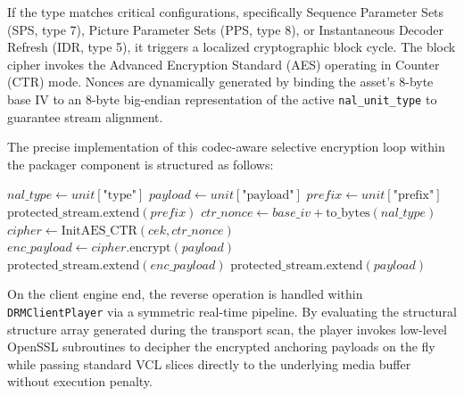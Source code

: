 If the type matches critical configurations, specifically Sequence Parameter Sets (SPS, type 7), Picture Parameter Sets (PPS, type 8), or Instantaneous Decoder Refresh (IDR, type 5), it triggers a localized cryptographic block cycle. The block cipher invokes the Advanced Encryption Standard (AES) operating in Counter (CTR) mode. Nonces are dynamically generated by binding the asset's 8-byte base IV to an 8-byte big-endian representation of the active \texttt{nal\_unit\_type} to guarantee stream alignment. 

The precise implementation of this codec-aware selective encryption loop within the packager component is structured as follows:

\begin{algorithm}[H]
\caption{Codec-Aware Selective Stream Encryption Loop}\label{alg:selective_loop}
\begin{algorithmic}[1]
    \State $nal\_type \leftarrow unit[\text{"type"}]$
    \State $payload \leftarrow unit[\text{"payload"}]$
    \State $prefix \leftarrow unit[\text{"prefix"}]$
    \State $\text{protected\_stream}.\text{extend}(prefix)$ 
        \State $ctr\_nonce \leftarrow base\_iv + \text{to\_bytes}(nal\_type)$
        \State $cipher \leftarrow \text{InitAES\_CTR}(cek, ctr\_nonce)$
        \State $enc\_payload \leftarrow cipher.\text{encrypt}(payload)$
        \State $\text{protected\_stream}.\text{extend}(enc\_payload)$
    \Else
        \State $\text{protected\_stream}.\text{extend}(payload)$ 
    \EndIf
\EndFor
\end{algorithmic}
\end{algorithm}

On the client engine end, the reverse operation is handled within \texttt{DRMClientPlayer} via a symmetric real-time pipeline. By evaluating the structural structure array generated during the transport scan, the player invokes low-level OpenSSL subroutines to decipher the encrypted anchoring payloads on the fly while passing standard VCL slices directly to the underlying media buffer without execution penalty.